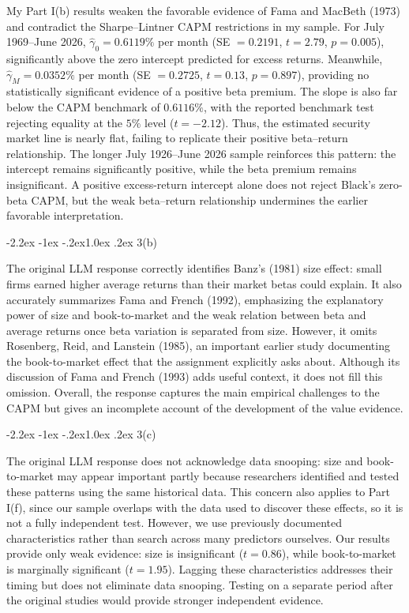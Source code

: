 \documentclass[11pt]{article}
\makeatletter
\renewcommand\subsection{\@startsection{subsection}{2}{0pt}%
  {-2.2ex \@plus -1ex \@minus -.2ex}{1.0ex \@plus .2ex}%
  {\normalfont\bfseries\normalsize\color{psink}}}
\makeatother
\begin{document}
My Part I(b) results weaken the favorable evidence of Fama and MacBeth (1973)
and contradict the Sharpe--Lintner CAPM restrictions in my sample. For July
1969--June 2026, $\hat\gamma_0 = 0.6119\%$ per month (SE $= 0.2191$,
$t = 2.79$, $p = 0.005$), significantly above the zero intercept predicted for
excess returns. Meanwhile, $\hat\gamma_M = 0.0352\%$ per month
(SE $= 0.2725$, $t = 0.13$, $p = 0.897$), providing no statistically
significant evidence of a positive beta premium. The slope is also far below
the CAPM benchmark of $0.6116\%$, with the reported benchmark test rejecting
equality at the $5\%$ level ($t = -2.12$). Thus, the estimated security market
line is nearly flat, failing to replicate their positive beta--return
relationship. The longer July 1926--June 2026 sample reinforces this pattern:
the intercept remains significantly positive, while the beta premium remains
insignificant. A positive excess-return intercept alone does not reject
Black's zero-beta CAPM, but the weak beta--return relationship undermines the
earlier favorable interpretation.

\subsection{3(b)}

The original LLM response correctly identifies Banz's (1981) size effect: small
firms earned higher average returns than their market betas could explain. It
also accurately summarizes Fama and French (1992), emphasizing the explanatory
power of size and book-to-market and the weak relation between beta and average
returns once beta variation is separated from size. However, it omits
Rosenberg, Reid, and Lanstein (1985), an important earlier study documenting
the book-to-market effect that the assignment explicitly asks about. Although
its discussion of Fama and French (1993) adds useful context, it does not fill
this omission. Overall, the response captures the main empirical challenges to
the CAPM but gives an incomplete account of the development of the value
evidence.

\subsection{3(c)}

The original LLM response does not acknowledge data snooping: size and
book-to-market may appear important partly because researchers identified and
tested these patterns using the same historical data. This concern also applies
to Part I(f), since our sample overlaps with the data used to discover these
effects, so it is not a fully independent test. However, we use previously
documented characteristics rather than search across many predictors ourselves.
Our results provide only weak evidence: size is insignificant ($t = 0.86$),
while book-to-market is marginally significant ($t = 1.95$). Lagging these
characteristics addresses their timing but does not eliminate data snooping.
Testing on a separate period after the original studies would provide stronger
independent evidence.
\end{document}
